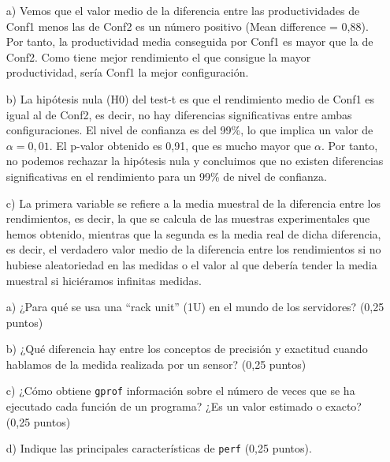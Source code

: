 \documentclass[a4paper,12pt]{article}
\begin{document}
\begin{itemize}
    \item [a)]Vemos que el valor medio de la diferencia entre las productividades de Conf1 menos las de Conf2 es un número positivo (Mean difference = 0,88). Por tanto, la productividad media conseguida por Conf1 es mayor que la de Conf2. Como tiene mejor rendimiento el que consigue la mayor productividad, sería Conf1 la mejor configuración.
    \item [b)] La hipótesis nula (H0) del test-t es que el rendimiento medio de Conf1 es igual al de Conf2, es decir, no hay diferencias significativas entre ambas configuraciones. El nivel de confianza es del 99\%, lo que implica un valor de $\alpha = 0{,}01$. El p-valor obtenido es 0,91, que es mucho mayor que $\alpha$. Por tanto, no podemos rechazar la hipótesis nula y concluimos que no existen diferencias significativas en el rendimiento para un 99\% de nivel de confianza.
    \item [c)] La primera variable se refiere a la media muestral de la diferencia entre los rendimientos, es decir, la que se calcula de las muestras experimentales que hemos obtenido, mientras que la segunda es la media real de dicha diferencia, es decir, el verdadero valor medio de la diferencia entre los rendimientos si no hubiese aleatoriedad en las medidas o el valor al que debería tender la media muestral si hiciéramos infinitas medidas.
\end{itemize}

\begin{tcolorbox}[colback=white!95!gray, colframe=black, title=5.- (1 punto) Cuestiones.]
    \begin{enumerate}
        \item[a)] ¿Para qué se usa una ``rack unit'' (1U) en el mundo de los servidores? (0,25 puntos)
        \item[b)] ¿Qué diferencia hay entre los conceptos de precisión y exactitud cuando hablamos de la medida realizada por un sensor? (0,25 puntos)
        \item[c)] ¿Cómo obtiene \texttt{gprof} información sobre el número de veces que se ha ejecutado cada función de un programa? ¿Es un valor estimado o exacto? (0,25 puntos)
        \item[d)] Indique las principales características de \texttt{perf} (0,25 puntos).
    \end{enumerate}
\end{tcolorbox}
\end{document}
